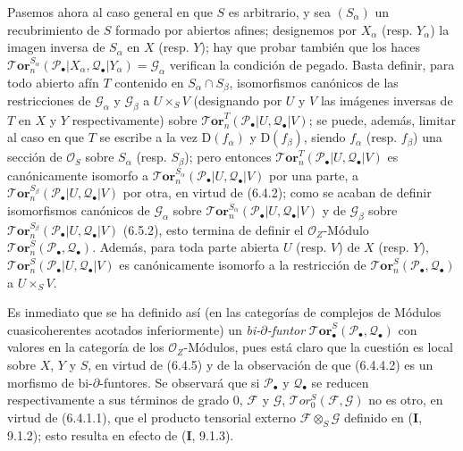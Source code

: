 \begin{env}[6.5.3]
Pasemos ahora al caso general en que $S$ es arbitrario, y sea $(S_\alpha)$
un recubrimiento de $S$ formado por abiertos afines; designemos por $X_\alpha$
(resp. $Y_\alpha$) la imagen inversa de $S_\alpha$ en $X$ (resp. $Y$);
hay que probar también que los haces
$\boldsymbol{\mathscr{T}\!or}_n^{S_\alpha}
  (\mathscr P_\bullet|X_\alpha,\mathscr Q_\bullet|Y_\alpha)
  =\mathscr G_\alpha$
verifican la condición de pegado. Basta definir, para todo abierto
afín $T$ contenido en $S_\alpha\cap S_\beta$, isomorfismos canónicos de las
restricciones de $\mathscr G_\alpha$ y $\mathscr G_\beta$ a $U\times_S V$ (designando
por $U$ y $V$ las imágenes inversas de $T$ en $X$ y $Y$
respectivamente) sobre
$\boldsymbol{\mathscr{T}\!or}_n^T(\mathscr P_\bullet|U,\mathscr Q_\bullet|V)$; se puede,
además, limitar al caso en que $T$ se escribe a la vez $\mathrm D(f_\alpha)$ y
$\mathrm D(f_\beta)$, siendo $f_\alpha$ (resp. $f_\beta$) una sección de
$\mathscr O_S$ sobre $S_\alpha$ (resp. $S_\beta$); pero entonces
$\boldsymbol{\mathscr{T}\!or}_n^T(\mathscr P_\bullet|U,\mathscr Q_\bullet|V)$ es
canónicamente isomorfo a
$\boldsymbol{\mathscr{T}\!or}_n^{S_\alpha}(\mathscr P_\bullet|U,\mathscr Q_\bullet|V)$
por una parte, a
$\boldsymbol{\mathscr{T}\!or}_n^{S_\beta}(\mathscr P_\bullet|U,\mathscr Q_\bullet|V)$
por otra, en virtud de (6.4.2); como se acaban de definir isomorfismos
canónicos de $\mathscr G_\alpha$ sobre
$\boldsymbol{\mathscr{T}\!or}_n^{S_\alpha}(\mathscr P_\bullet|U,\mathscr Q_\bullet|V)$ y
de $\mathscr G_\beta$ sobre
$\boldsymbol{\mathscr{T}\!or}_n^{S_\beta}(\mathscr P_\bullet|U,\mathscr Q_\bullet|V)$
(6.5.2), esto termina de definir el $\mathscr O_Z$-Módulo
$\boldsymbol{\mathscr{T}\!or}_n^S(\mathscr P_\bullet,\mathscr Q_\bullet)$. Además, para
toda parte abierta $U$ (resp. $V$) de $X$ (resp. $Y$),
$\boldsymbol{\mathscr{T}\!or}_n^S(\mathscr P_\bullet|U,\mathscr Q_\bullet|V)$ es
canónicamente isomorfo a la restricción de
$\boldsymbol{\mathscr{T}\!or}_n^S(\mathscr P_\bullet,\mathscr Q_\bullet)$ a $U\times_S V$.

Es inmediato que se ha definido así (en las categorías de complejos de
Módulos cuasicoherentes acotados inferiormente) un \emph{bi-$\partial$-funtor}
$\boldsymbol{\mathscr{T}\!or}_\bullet^S(\mathscr P_\bullet,\mathscr Q_\bullet)$ con valores
en la categoría de los $\mathscr O_Z$-Módulos, pues está claro que la cuestión
es local sobre $X$, $Y$ y $S$, en virtud de (6.4.5) y de la observación de que
(6.4.4.2) es un morfismo de bi-$\partial$-funtores. Se observará que si
$\mathscr P_\bullet$ y $\mathscr Q_\bullet$ se reducen respectivamente a
sus términos de grado 0, $\mathscr F$ y $\mathscr G$,
$\mathscr{T}\!or_0^S(\mathscr F,\mathscr G)$ no es otro, en virtud de
(6.4.1.1), que el producto tensorial externo $\mathscr F\otimes_S\mathscr G$
definido en (\textbf{I}, 9.1.2); esto resulta en efecto de (\textbf{I}, 9.1.3).
\end{env}

